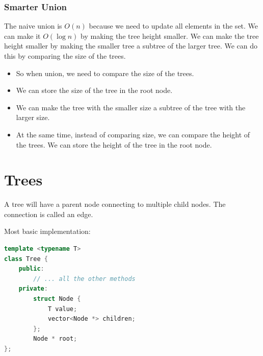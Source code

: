 \documentclass[letterpaper,12pt]{article}
\begin{document}
\subsubsection{Smarter Union}
The naive union is $O(n)$ because we need to update all elements in the set. We can make it $O(\log n)$ by making the tree height smaller. We can make the tree height smaller by making the smaller tree a subtree of the larger tree. We can do this by comparing the size of the trees.
\begin{itemize}
    \item So when union, we need to compare the size of the trees.
    \item We can store the size of the tree in the root node.
    \item We can make the tree with the smaller size a subtree of the tree with the larger size.
\end{itemize}
\begin{itemize}
    \item At the same time, instead of comparing size, we can compare the height of the trees. We can store the height of the tree in the root node.
\end{itemize}
\section{Trees}
A tree will have a parent node connecting to multiple child nodes. The connection is called an edge. 

Most basic implementation: \begin{lstlisting}[language=C++]
template <typename T>
class Tree {
    public:
        // ... all the other methods
    private:
        struct Node {
            T value;
            vector<Node *> children;
        };
        Node * root;
};

\end{lstlisting}
\end{document}
